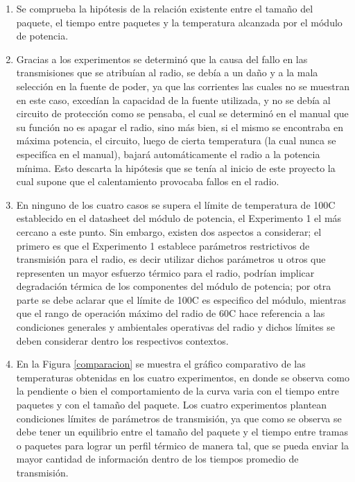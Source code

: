 \begin{enumerate}
    \item Se comprueba la hipótesis de la relación existente entre el tamaño del paquete, el tiempo entre paquetes y la temperatura alcanzada por el módulo de potencia.
    
    \item Gracias a los experimentos se determinó que la causa del fallo en las transmisiones que se atribuían al radio, se debía a un daño y a la mala selección en la fuente de poder, ya que las corrientes las cuales no se muestran en este caso, excedían la capacidad de la fuente utilizada, y no se debía al circuito de protección como se pensaba, el cual se determinó en el manual que su función no es apagar el radio, sino más bien, si el mismo se encontraba en máxima potencia, el circuito, luego de cierta temperatura (la cual nunca se especifíca en el manual), bajará automáticamente el radio a la potencia mínima. Esto descarta la hipótesis que se tenía al inicio de este proyecto la cual supone que el calentamiento provocaba fallos en el radio.
    
    \item En ninguno de los cuatro casos se supera el límite de temperatura de 100\degree C establecido en el datasheet del módulo de potencia, el Experimento 1 el más cercano a este punto. Sin embargo, existen dos aspectos a considerar; el primero es que el Experimento 1 establece parámetros restrictivos de transmisión para el radio, es decir utilizar dichos parámetros u otros que representen un mayor esfuerzo térmico para el radio, podrían implicar degradación térmica de los componentes del módulo de potencia; por otra parte se debe aclarar que el límite de 100\degree C es especifico del módulo, mientras que el rango de operación máximo del radio de 60\degree C hace referencia a las condiciones generales y ambientales operativas del radio y dichos límites se deben considerar dentro los respectivos contextos.
    
    \item En la Figura \ref{comparacion} se muestra el gráfico comparativo de las temperaturas obtenidas en los cuatro experimentos, en donde se observa como la pendiente o bien el comportamiento de la curva varia con el tiempo entre paquetes y con el tamaño del paquete. Los cuatro experimentos plantean condiciones límites de parámetros de transmisión, ya que como se observa se debe tener un equilibrio entre el tamaño del paquete y el tiempo entre tramas o paquetes para lograr un perfil térmico de manera tal, que se pueda enviar la mayor cantidad de información dentro de los tiempos promedio de transmisión.
    

\end{enumerate}

